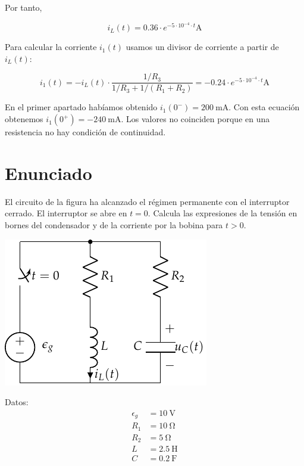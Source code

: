 Por tanto,

\begin{equation*}
  i_L(t) = 0.36 \cdot e^{-5 \cdot 10^{-4} \cdot t}\si{\ampere}
\end{equation*}

Para calcular la corriente $i_1(t)$ usamos un divisor de corriente a
partir de $i_L(t)$:

\begin{equation*}
  i_1(t) = -i_L(t) \cdot \frac{1/R_3}{1/R_3 + 1/(R_1 + R_2)} = -0.24 \cdot e^{-5 \cdot 10^{-4} \cdot t}\si{\ampere}
\end{equation*}

En el primer apartado habíamos obtenido
$i_1(0^-) = \SI{200}{\milli\ampere}$. Con esta ecuación obtenemos
$i_1(0^+) = -\SI{240}{\milli\ampere}$. Los valores no coinciden porque
en una resistencia no hay condición de continuidad.

\section{Enunciado}

El circuito de la figura ha alcanzado el régimen permanente con el
interruptor cerrado. El interruptor se abre en $t = 0$. Calcula las
expresiones de la tensión en bornes del condensador y de la corriente
por la bobina para $t > 0$.

\vspace*{1cm}

\begin{minipage}{0.7\textwidth}
  \includegraphics[scale=0.95]{figuras/FM_4_8}
\end{minipage}
\hfill
\begin{minipage}{0.3\textwidth}
  Datos:
  \begin{align*}
    \epsilon_g &= \SI{10}{\volt}\\
    R_1 &= \SI{10}{\ohm}\\
    R_2 &= \SI{5}{\ohm}\\
    L &= \SI{2.5}{\henry}\\
    C &= \SI{0.2}{\farad}      
  \end{align*}
\end{minipage}

